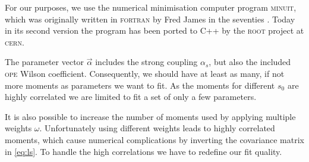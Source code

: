 \documentclass[../../index.tex]{subfiles}
\begin{document}
For our purposes, we use the numerical minimisation computer program
\textsc{minuit}, which was originally written in \textsc{fortran} by Fred James
in the seventies \cite{James1975}. Today in its second version the program has been
ported to C++ by the \textsc{root} \cite{Brun1997} project at \textsc{cern}.

The parameter vector \(\vec\alpha\) includes the strong coupling \(\alpha_s\),
but also the included \textsc{ope} Wilson coefficient. Consequently, we should
have at least as many, if not more moments as parameters we want to fit. As the
moments for different \(s_0\) are highly correlated we are limited to fit a set
of only a few parameters.

It is also possible to increase the number of moments used by applying multiple
weights \(\omega\). Unfortunately using different weights leads to highly
correlated moments, which cause numerical complications by inverting the
covariance matrix in \cref{eq:ls}. To handle the high correlations we have to
redefine our fit quality.
\end{document}
